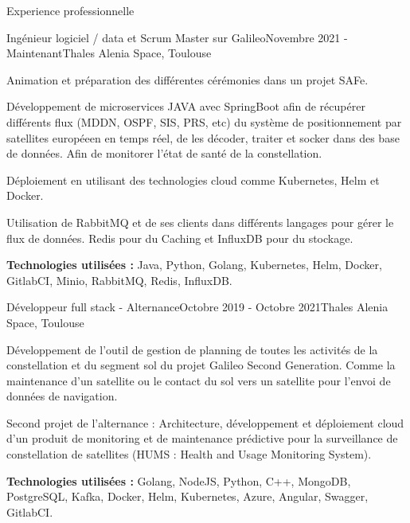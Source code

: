 \documentclass[
	10pt, %
]{resume} %
\begin{document}

\begin{rSection}{Experience professionnelle}

	\begin{rSubsection}{Ingénieur logiciel / data et Scrum Master sur Galileo}{Novembre 2021 - Maintenant}{Thales Alenia Space, Toulouse}{}
		\item Animation et préparation des différentes cérémonies dans un projet SAFe.
		\item Développement de microservices JAVA avec SpringBoot afin de récupérer différents flux (MDDN, OSPF, SIS, PRS, etc) du système de positionnement par satellites européeen en temps réel, de les décoder, traiter et socker dans des base de données. Afin de monitorer l'état de santé de la constellation. 
 		\item Déploiement en utilisant des technologies cloud comme Kubernetes, Helm et Docker.
 		\item Utilisation de RabbitMQ et de ses clients dans différents langages pour gérer le flux de données. Redis pour du Caching et InfluxDB pour du stockage.
		\item \textbf{Technologies utilisées : }Java, Python, Golang, Kubernetes, Helm, Docker, GitlabCI, Minio, RabbitMQ, Redis, InfluxDB.
	\end{rSubsection}

	\begin{rSubsection}{Développeur full stack - Alternance}{Octobre 2019 - Octobre 2021}{Thales Alenia Space, Toulouse}{}
 		\item Développement de l'outil de gestion de planning de toutes les activités de la constellation et du segment sol du projet Galileo Second Generation. Comme la maintenance d'un satellite ou le contact du sol vers un satellite pour l'envoi de données de navigation.
 		\item Second projet de l'alternance : Architecture, développement et déploiement cloud d'un produit de monitoring et de maintenance prédictive 
			pour la surveillance de constellation de satellites (HUMS : Health and Usage Monitoring System).
		\item \textbf{Technologies utilisées :} Golang, NodeJS, Python, C++, MongoDB, PostgreSQL, Kafka, Docker, Helm, Kubernetes, Azure, Angular, Swagger, GitlabCI.
	\end{rSubsection}


\end{rSection}
\end{document}
